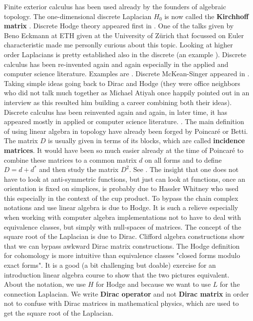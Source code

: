 \documentclass[12pt]{amsart}
\begin{document}
Finite exterior calculus has been used already by the founders of algebraic
topology. The one-dimensional discrete Laplacian $H_0$ is now called the {\bf Kirchhoff matrix} \cite{Kirc}.
Discrete Hodge theory appeared first in \cite{Eckmann1944}. One of the talks
given by Beno Eckmann at ETH given at the University of Z\"urich that focussed on Euler characteristic 
made me personlly curious about this topic.  Looking at higher order Laplacians is pretty established 
also in the discrete (an example \cite{DanijelaJost}). Discrete calculus has been re-invented again and again
especially in the applied and computer science literature. Examples are \cite{marsden_discretecalculus,marsden_poincarelemma}.
Discrete McKean-Singer \cite{McKeanSinger} appeared in \cite{knillmckeansinger}. Taking simple ideas going
back to Dirac and Hodge (they were office neighbors who did not talk much together as
Michael Atiyah once happily pointed out in an interview as this resulted him building a career combining both their
ideas).  Discrete calculus has been reinvented again and
again, in later time, it has appeared mostly in applied or computer science literature. 
\cite{Edelsbrunner}. 
The main definition of using linear algebra in topology have already been forged 
by Poincar\'e or Betti. The matrix $D$ is usually given in terms of its blocks, which are called 
{\bf incidence matrices}. It would have been so much easier already at the time of Poincar\'e to
combine these matrices to a common matrix $d$ on all forms and to define $D=d+d^*$ and then study
the matrix $D^2$. See \cite{KnillILAS}. The insight that one does not have to look at 
anti-symmetric functions, but just can look at functions, once an orientation 
is fixed on simplices, is probably due to Hassler Whitney who used this especially in the context 
of the cup product. To bypass the chain complex notations and use linear algebra is due to Hodge. 
It is such a relieve especially when working with computer algebra implementations not to have to deal
with equivalence classes, but simply with null-spaces of matrices.
The concept of the square root of the Laplacian is due to Dirac. Clifford algebra constructions 
show that we can bypass awkward Dirac matrix constructions. 
The Hodge definition for cohomology is more intuitive than equivalence classes 
"closed forms modulo exact forms". It is a good (a bit challenging but doable) exercise for 
an introduction linear algebra course to show that the two pictures equivalent. 
About the notation, we use $H$ for Hodge and because we want to use $L$ for the 
connection Laplacian. We write {\bf Dirac operator} and not {\bf Dirac matrix} in order
not to confuse with Dirac matrices in mathematical physics, which are used to get the 
square root of the Laplacian. \\
\end{document}
